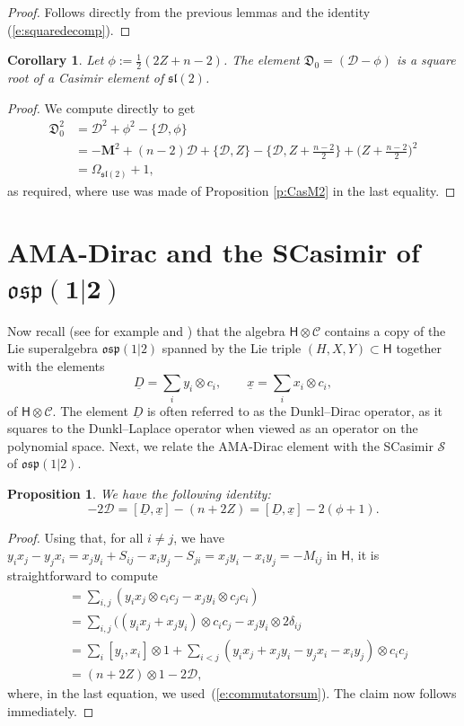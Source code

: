 \documentclass[pdftex]{sigma}
\numberwithin{equation}{section}
\newtheorem{Corollary}[Theorem]{Corollary}
\newtheorem{Proposition}[Theorem]{Proposition}
 { \theoremstyle{definition}
\newtheorem{Definition}[Theorem]{Definition}
\newtheorem{Note}[Theorem]{Note}
\newtheorem{Example}[Theorem]{Example}
\newtheorem{Remark}[Theorem]{Remark} }
\newcommand{\ux}{\underline{x}}
\newcommand{\uD}{\underline{D}}
\begin{document}
\begin{proof}
Follows directly from the previous lemmas and the identity (\ref{e:squaredecomp}).
\end{proof}

\begin{Corollary}\label{c:DiracSquare}
Let $\phi := \tfrac{1}{2}(2Z + n-2)$. The element $\mathfrak{D}_0 = (\mathcal{D} - \phi)$ is a square root of a Casimir element of $\mathfrak{sl}(2)$.
\end{Corollary}

\begin{proof}
We compute directly to get
\begin{align*}
 \mathfrak{D}_0^2 &= \mathcal{D}^2 + \phi^2 -\{\mathcal{D},\phi\}\\
 &= -\mathbf{M}^2 + (n-2)\mathcal{D} + \{\mathcal{D},Z\} - \big\{\mathcal{D},Z + \tfrac{n-2}{2}\big\} + \big(Z + \tfrac{n-2}{2}\big)^2\\
 &= \Omega_{\mathfrak{sl}(2)} + 1,
\end{align*}
as required, where use was made of Proposition \ref{p:CasM2} in the last equality.
\end{proof}

\section[AMA-Dirac and the SCasimir of osp(1|2)]{AMA-Dirac and the SCasimir of $\boldsymbol{\mathfrak{osp}(1|2)}$}\label{s:SCasimir}
Now recall (see for example \cite{DOV18a} and \cite{DOV18b}) that the algebra $\mathsf{H}\otimes\mathcal{C}$ contains a copy of the Lie superalgebra $\mathfrak{osp}(1|2)$ spanned by the Lie triple $(H,X,Y)\subset \mathsf{H}$ together with the elements
\[
\uD = \sum_i y_i\otimes c_i,\qquad \ux =\sum_i x_i\otimes c_i,
\]
of $\mathsf{H}\otimes\mathcal{C}$. The element $\uD$ is often referred to as the Dunkl--Dirac operator, as it squares to the Dunkl--Laplace operator when viewed as an operator on the polynomial space. Next, we relate the AMA-Dirac element with the SCasimir $\mathcal{S}$ of $\mathfrak{osp}(1|2)$.

\begin{Proposition}
We have the following identity:
\[-2\mathcal{D} = [\uD,\ux] - (n+2Z) = [\uD,\ux] - 2(\phi+1).\]
\end{Proposition}

\begin{proof}
Using that, for all $i\neq j$, we have $y_ix_j - y_jx_i = x_jy_i +S_{ij} - x_iy_j - S_{ji} = x_jy_i - x_iy_j = -M_{ij}$ in $\mathsf{H}$, it is straightforward to compute
\begin{align*}
 [\uD,\ux] &= \sum_{i,j}(y_ix_j\otimes c_ic_j - x_jy_i\otimes c_jc_i)\\
 &=\sum_{i,j}( (y_ix_j + x_jy_i)\otimes c_ic_j -x_jy_i\otimes 2\delta_{ij}\\
 &=\sum_i[y_i,x_i]\otimes 1 + \sum_{i< j}(y_ix_j + x_jy_i - y_jx_i - x_iy_j)\otimes c_ic_j\\
 &=(n+2Z)\otimes 1 -2\mathcal{D},
\end{align*}
where, in the last equation, we used~(\ref{e:commutatorsum}). The claim now follows immediately.
\end{proof}
\end{document}
